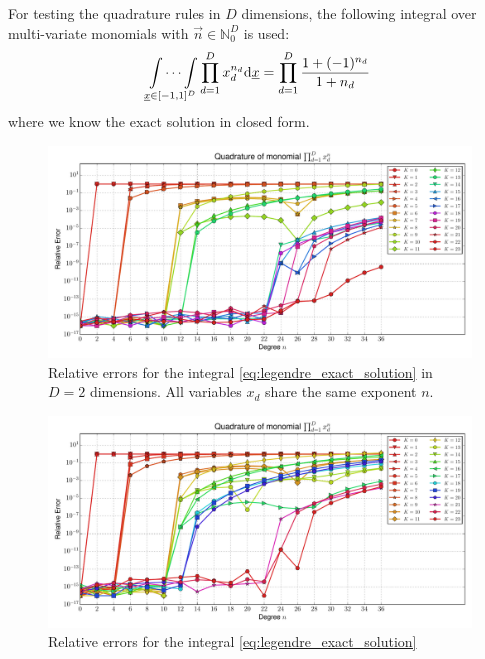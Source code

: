 \documentclass[a4paper,10pt]{article}
\begin{document}
For testing the quadrature rules in $D$ dimensions, the following integral
over multi-variate monomials with $\vec{n} \in \mathbb{N}_0^D$ is used:
\begin{equation} \label{eq:legendre_exact_solution}
  \idotsint \limits_{\underline{x} \in [-1,1]^D} \prod_{d=1}^D x_d^{n_d} \mathrm{d}\underline{x}
  =
  \prod_{d=1}^D \frac{1 + (-1)^{n_d}}{1 + n_d}
\end{equation}
where we know the exact solution in closed form.

\begin{subfigures}
  \label{fig:monomial_errors_legendre_multivariate}
  \begin{figure}\centering
    \includegraphics[width=\linewidth]{./img/monomial_errors_legendre_multivariate_dimension_2.pdf}
    \caption{Relative errors for the integral \eqref{eq:legendre_exact_solution}
    in $D=2$ dimensions. All variables $x_d$ share the same exponent $n$.}
    \label{fig:monomial_errors_legendre_multivariate_dimension_2}
  \end{figure}
  \begin{figure}\centering
    \includegraphics[width=\linewidth]{./img/monomial_errors_legendre_multivariate_dimension_3.pdf}
    \caption{Relative errors for the integral \eqref{eq:legendre_exact_solution}
}
\end{figure}
\end{subfigures}
\end{document}
